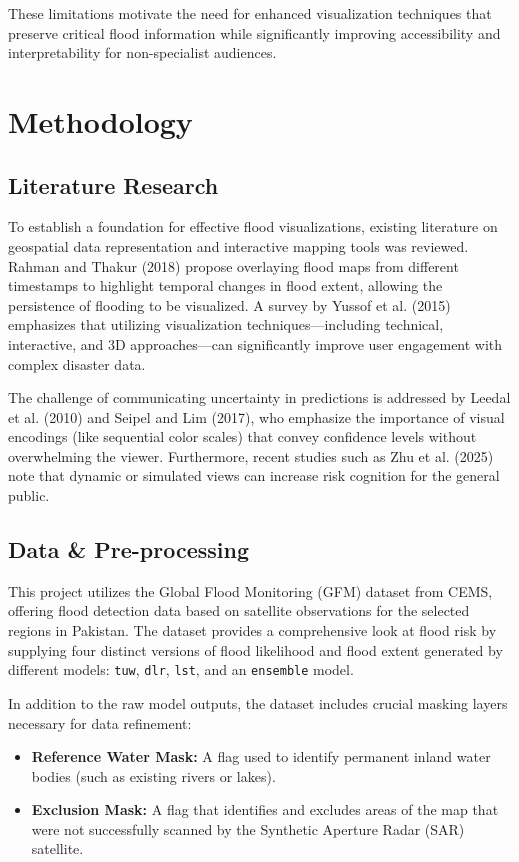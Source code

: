 \documentclass[11pt, a4paper]{article}
\begin{document}
These limitations motivate the need for enhanced visualization techniques that preserve critical flood information while significantly improving accessibility and interpretability for non-specialist audiences.

\section{Methodology}
\label{sec:methods}

\subsection{Literature Research}
To establish a foundation for effective flood visualizations, existing literature on geospatial data representation and interactive mapping tools was reviewed. Rahman and Thakur (2018) propose overlaying flood maps from different timestamps to highlight temporal changes in flood extent, allowing the persistence of flooding to be visualized. A survey by Yussof et al. (2015) emphasizes that utilizing visualization techniques—including technical, interactive, and 3D approaches—can significantly improve user engagement with complex disaster data. 

The challenge of communicating uncertainty in predictions is addressed by Leedal et al. (2010) and Seipel and Lim (2017), who emphasize the importance of visual encodings (like sequential color scales) that convey confidence levels without overwhelming the viewer. Furthermore, recent studies such as Zhu et al. (2025) note that dynamic or simulated views can increase risk cognition for the general public.

\subsection{Data \& Pre-processing}
\label{subsec:data}
This project utilizes the Global Flood Monitoring (GFM) dataset from CEMS, offering flood detection data based on satellite observations for the selected regions in Pakistan. The dataset provides a comprehensive look at flood risk by supplying four distinct versions of flood likelihood and flood extent generated by different models: \texttt{tuw}, \texttt{dlr}, \texttt{lst}, and an \texttt{ensemble} model. 

In addition to the raw model outputs, the dataset includes crucial masking layers necessary for data refinement:
\begin{itemize}
    \item \textbf{Reference Water Mask:} A flag used to identify permanent inland water bodies (such as existing rivers or lakes).
    \item \textbf{Exclusion Mask:} A flag that identifies and excludes areas of the map that were not successfully scanned by the Synthetic Aperture Radar (SAR) satellite.
\end{itemize}
\end{document}
